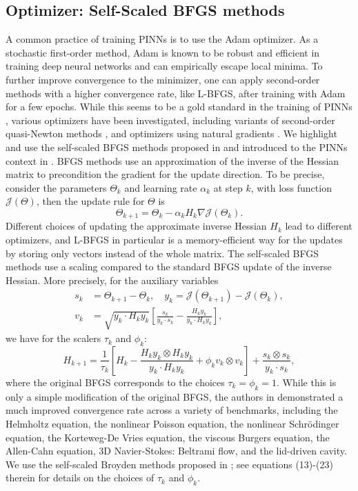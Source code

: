 \documentclass[12pt]{caltech_thesis}
\numberwithin{equation}{section}
\begin{document}
\subsection{Optimizer: Self-Scaled BFGS methods}\label{subsec:optimizer}
A common practice of training PINNs is to use the Adam optimizer.
As a stochastic first-order method, Adam is known to be robust and efficient in training deep neural networks
and can empirically escape local minima. To further improve convergence to the minimizer, one 
can apply second-order methods with a higher convergence rate, like L-BFGS, after training with Adam for 
a few epochs. While this seems to be a gold standard in the training of PINNs \cite{rathore2024challenges}, various optimizers have been investigated,
 including variants of 
second-order quasi-Newton methods \cite{rathore2024challenges,wang2025gradient}, and optimizers using natural gradients \cite{muller2023achieving,jnini2024gauss,chen2024teng}.
We highlight and use the self-scaled BFGS methods proposed in \cite{al1998numerical,al2014broyden} and introduced to the PINNs context in \cite{urban2025unveiling,kiyani2025optimizer}.
BFGS methods use an approximation of the inverse of the Hessian matrix to precondition the gradient for the update direction. To be precise, consider the parameters $\Theta_k$ and learning rate $\alpha_k$ at step $k$, with loss function $\mathcal{J}(\Theta)$, then the update rule for $\Theta$ is $$\Theta_{k+1}=\Theta_k-\alpha_k H_k\nabla\mathcal{J}(\Theta_k).$$ Different choices of updating the approximate inverse Hessian $H_k$ lead to different optimizers, and L-BFGS in particular is a memory-efficient way for the updates by storing only vectors instead of the whole matrix.
The self-scaled BFGS methods use a scaling compared to the standard BFGS update of the inverse Hessian. More precisely, for the auxiliary variables $$\begin{aligned}
    s_k&=\Theta_{k+1}-\Theta_k,\quad y_k=\mathcal{J}(\Theta_{k+1})-\mathcal{J}(\Theta_k),\\{v}_k&=\sqrt{{y}_k \cdot H_k {y}_k}\left[\frac{{s}_k}{{y}_k \cdot {s}_k}-\frac{H_k {y}_k}{{y}_k \cdot H_k {y}_k}\right],\end{aligned}$$
    we have  for the scalers $\tau_k$ and $\phi_k$: $$H_{k+1}=\frac{1}{\tau_k}\left[H_k-\frac{H_k {y}_k \otimes H_k {y}_k}{{y}_k \cdot H_k {y}_k}+\phi_k {v}_k \otimes {v}_k\right]+\frac{{s}_k \otimes {s}_k}{{y}_k \cdot {s}_k},$$
   where the original BFGS corresponds to the choices $\tau_k=\phi_k=1$.
While this is only a simple modification of the original BFGS, the authors in \cite{urban2025unveiling} demonstrated a much improved convergence rate
across a variety of benchmarks, including the  Helmholtz equation, the nonlinear Poisson equation, the nonlinear Schrödinger equation, the Korteweg-De Vries equation, the viscous Burgers equation, the Allen-Cahn equation, 3D Navier-Stokes: Beltrami flow, and the lid-driven cavity.
We use the self-scaled Broyden methods proposed in \cite{urban2025unveiling}; see equations (13)-(23) therein for details on the choices of  $\tau_k$ and $\phi_k$.
\end{document}
